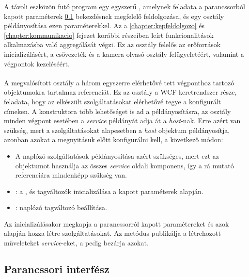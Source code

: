 A távoli eszközön futó program egy egyszerű , amelynek feladata a parancssorból kapott paraméterek \ref{subs:cli} bekezdésnek megfelelő feldolgozása, és egy  osztály példányosítása ezen paraméterekkel. Az  a \ref{chapter:kepfeldolgozo} és \ref{chapter:kommunikacio} fejezet korábbi részeiben leírt funkcionalitások alkalmazásba való aggregálását végzi. Ez az osztály felelős az erőforrások inicializálásért, a csővezeték és a kamera olvasó osztály felügyeletéért, valamint a végpontok kezeléséért.\\
\\
A megvalósított osztály a három egyszerre elérhetővé tett végponthoz tartozó  objektumokra tartalmaz referenciát. Ez az osztály a WCF keretrendszer része, feladata, hogy az elkészült szolgáltatásokat elérhetővé tegye a konfigurált címeken. A konstruktora több lehetőséget is ad a példányosításra, az  osztály minden végpont esetében a \emph{service} példányát adja át a \emph{host}-nak. Erre azért van szükség, mert a szolgáltatásokat alapesetben a \emph{host} objektum példányosítja, azonban azokat a megnyitásuk előtt konfigurálni kell, a következő módon:
\begin{itemize}
\item A naplózó szolgáltatások példányosítása azért szükséges, mert ezt az objektumot használja az összes \emph{service} oldali komponens, így a rá mutató referenciára mindenképp szükség van.
\item {}: a ,  és  tagváltozók inicializálása a kapott paraméterek alapján.
\item {}: naplózó tagváltozó beállítása.
\end{itemize}

Az  inicializálásakor megkapja a parancssorról kapott paramétereket és azok alapján hozza létre szolgáltatásokat. Az  metódus publikálja a létrehozott műveleteket \emph{service}-eket, a  pedig bezárja azokat.

\subsection{Parancssori interfész} \label{subs:cli}

